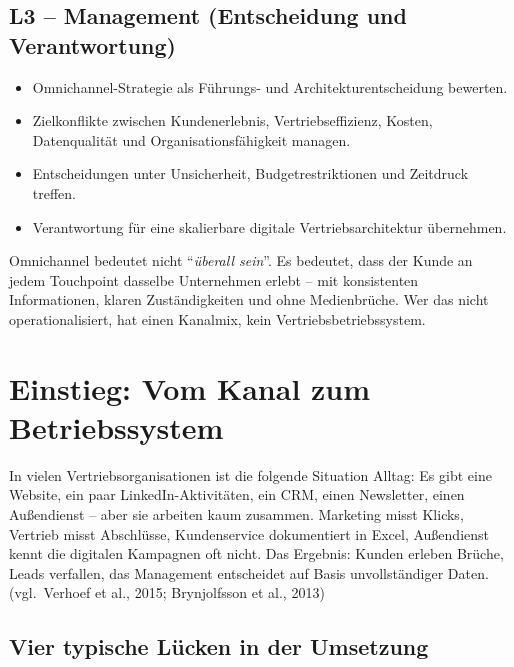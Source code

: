\documentclass[11pt,a4paper,oneside]{article}
\newcommand{\quelle}[1]{{\footnotesize\color{lpGray}(#1)}}
\begin{document}
\subsection*{L3 -- Management (Entscheidung und Verantwortung)}
\begin{itemize}
  \item Omnichannel-Strategie als Führungs- und Architekturentscheidung bewerten.
  \item Zielkonflikte zwischen Kundenerlebnis, Vertriebseffizienz, Kosten, Datenqualität und Organisationsfähigkeit managen.
  \item Entscheidungen unter Unsicherheit, Budgetrestriktionen und Zeitdruck treffen.
  \item Verantwortung für eine skalierbare digitale Vertriebsarchitektur übernehmen.
\end{itemize}

\begin{merkbox}
Omnichannel bedeutet nicht ``\emph{überall sein}''. Es bedeutet, dass der Kunde an jedem Touchpoint dasselbe Unternehmen erlebt -- mit konsistenten Informationen, klaren Zuständigkeiten und ohne Medienbrüche. Wer das nicht operationalisiert, hat einen Kanalmix, kein Vertriebsbetriebssystem.
\end{merkbox}

\clearpage

\section{Einstieg: Vom Kanal zum Betriebssystem}

In vielen Vertriebsorganisationen ist die folgende Situation Alltag: Es gibt eine Website, ein paar LinkedIn-Aktivitäten, ein CRM, einen Newsletter, einen Außendienst -- aber sie arbeiten kaum zusammen. Marketing misst Klicks, Vertrieb misst Abschlüsse, Kundenservice dokumentiert in Excel, Außendienst kennt die digitalen Kampagnen oft nicht. Das Ergebnis: Kunden erleben Brüche, Leads verfallen, das Management entscheidet auf Basis unvollständiger Daten. \quelle{vgl.\ Verhoef et al., 2015; Brynjolfsson et al., 2013}

\subsection{Vier typische Lücken in der Umsetzung}
\end{document}
